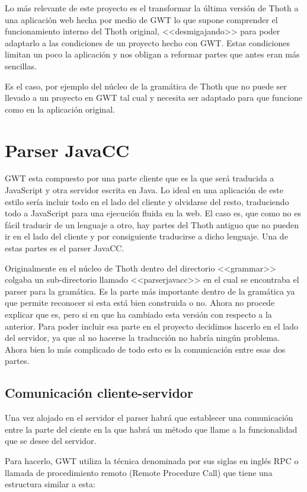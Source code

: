 
Lo más relevante de este proyecto es el transformar la última versión de Thoth a una aplicación web hecha por medio de GWT lo que supone comprender el funcionamiento interno del Thoth original, <<desmigajando>> para poder adaptarlo a las condiciones de un proyecto hecho con GWT.
Estas condiciones limitan un poco la aplicación y nos obligan a reformar partes que antes eran más sencillas.

Es el caso, por ejemplo del núcleo de la gramática de Thoth que no puede ser llevado a un proyecto en GWT tal cual y necesita ser adaptado para que funcione como en la aplicación original.
 
\section{Parser JavaCC}
GWT esta compuesto por una parte cliente que es la que será traducida a JavaScript y otra servidor escrita en Java. Lo ideal en una aplicación de este estilo sería incluir todo en el lado del cliente y olvidarse del resto, traduciendo todo a JavaScript para una ejecución fluida en la web. El caso es, que como no es fácil traducir de un lenguaje a otro, hay partes del Thoth antiguo que no pueden ir en el lado del cliente y por consiguiente traducirse a dicho lenguaje. Una de estas partes es el parser JavaCC.

Originalmente en el núcleo de Thoth dentro del directorio <<grammar>> colgaba un sub-directorio llamado <<parserjavacc>> en el cual se encontraba el parser para la gramática. Es la parte más importante dentro de la gramática ya que permite reconocer si esta está bien construida o no.
Ahora no procede explicar que es, pero si en que ha cambiado esta versión con respecto a la anterior. 
Para poder incluir esa parte en el proyecto decidimos hacerlo en el lado del servidor, ya que al no hacerse la traducción no habría ningún problema. Ahora bien lo más complicado de todo esto es la comunicación entre esas dos partes.
 
\subsection{Comunicación cliente-servidor}
Una vez alojado en el servidor el parser habrá que establecer una comunicación entre la parte del ciente en la que habrá un método que llame a la funcionalidad que se desee del servidor.

Para hacerlo, GWT utiliza la técnica denominada por sus siglas en inglés RPC o llamada de procedimiento remoto (Remote Procedure Call) que tiene una estructura similar a esta: 

